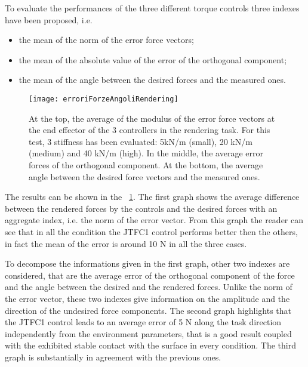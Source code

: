 \par To evaluate the performances of the three different torque controls three indexes have been proposed, i.e. 
\begin{itemize}
	\item the mean of the norm of the error force vectors;
	\item the mean of the absolute value of the error of the orthogonal component;
	\item the mean of the angle between the desired forces and the measured ones.
\end{itemize}

\begin{figure}[htb]
	\centering
	\texttt{[image: erroriForzeAngoliRendering]}
	\caption{At the top, the average of the modulus of the error force vectors at the end effector of the 3 controllers in the rendering task. For this test, 3 stiffness has been evaluated: 5kN/m (small), 20 kN/m (medium) and 40 kN/m (high). In the middle, the average error forces of the orthogonal component. At the bottom, the average angle between the desired force vectors and the measured ones.}
	\label{fig:renderingErrors}
\end{figure}

\par The results can be shown in the \figurename \ \ref{fig:renderingErrors}. The first graph shows the average difference between the rendered forces by the controls and the desired forces with an aggregate index, i.e. the norm of the error vector. From this graph the reader can see that in all the condition the JTFC1 control performs better then the others, in fact the mean of the error is around 10 N in all the three cases.
\par To decompose the informations given in the first graph, other two indexes are considered, that are the average error of the orthogonal component of the force and the angle between the desired and the rendered forces. Unlike the norm of the error vector, these two indexes give information on the amplitude and the direction of the undesired force components. The second graph highlights that the JTFC1 control leads to an average error of 5 N along the task direction independently from the environment parameters, that is a good result coupled with the exhibited stable contact with the surface in every condition.
The third graph is substantially in agreement with the previous ones.

